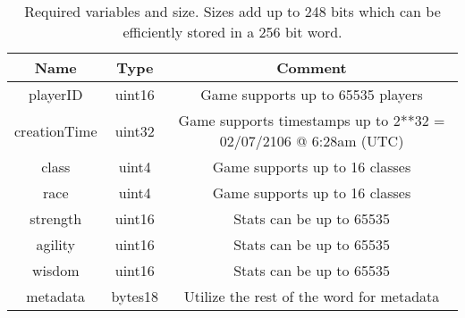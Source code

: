 \begin{table}[H]
	\centering
	\vspace*{-1ex}
	\scriptsize
	\vspace{-1ex}
	\begin{tabular}{|c|c|c|}
        \hline
        \textbf{Name} & \textbf{Type}  & \textbf{Comment}\\ \hline 
        playerID      & uint16         & Game supports up to 65535 players\\
        creationTime  & uint32         & Game supports timestamps up to 2**32 = 02/07/2106 @ 6:28am (UTC) \\
        class         & uint4          & Game supports up to 16 classes \\
        race          & uint4          & Game supports up to 16 classes \\
        strength      & uint16         & Stats can be up to 65535\\
        agility       & uint16         & Stats can be up to 65535 \\
        wisdom        & uint16         & Stats can be up to 65535 \\
        metadata      & bytes18        & Utilize the rest of the word for metadata \\
        \hline
    \end{tabular}
	\caption{Required variables and size. Sizes add up to 248 bits which can be efficiently stored in a 256 bit word.}
    \label{table:characteristics}
\end{table}